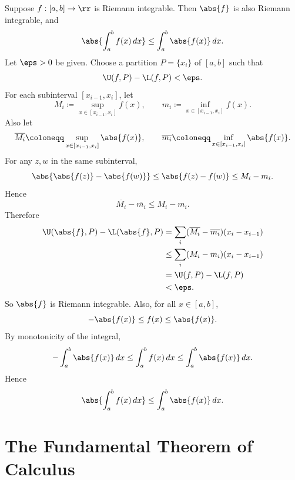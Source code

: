 

\begin{theorem}{
    Suppose $f:[a,b]\to\rr$ is Riemann integrable.
    Then $\abs{f}$ is also Riemann integrable, and
    \[
        \abs{\int_a^b f(x)\,dx}\leq\int_a^b\abs{f(x)}\,dx.
    \]
}
    Let $\eps > 0$ be given.
    Choose a partition $P=\{x_i\}$ of $[a,b]$ such that
    \[
        \U(f,P) - \L(f,P) < \eps.
    \]
    For each subinterval $[x_{i-1},x_i]$, let
    \[
        M_i \coloneqq \sup_{x\in[x_{i-1},x_i]} f(x),
        \qquad
        m_i \coloneqq \inf_{x\in[x_{i-1},x_i]} f(x).
    \]
    Also let
    \[
        \overline{M_i} \coloneqq \sup_{x\in[x_{i-1},x_i]} \abs{f(x)},
        \qquad
        \overline{m_i} \coloneqq \inf_{x\in[x_{i-1},x_i]} \abs{f(x)}.
    \]
    For any $z,w$ in the same subinterval,
    \[
        \abs{\abs{f(z)}-\abs{f(w)}} \leq \abs{f(z)-f(w)} \leq M_i-m_i.
    \]
    Hence
    \[
        \overline{M_i}-\overline{m_i}\leq M_i-m_i.
    \]
    Therefore
    \begin{align*}
        \U(\abs{f},P)-\L(\abs{f},P)
        &= \sum_i (\overline{M_i}-\overline{m_i})(x_i-x_{i-1})\\
        &\leq \sum_i (M_i-m_i)(x_i-x_{i-1})\\
        &= \U(f,P)-\L(f,P)\\
        &< \eps.
    \end{align*}
    So $\abs{f}$ is Riemann integrable.
    Also, for all $x\in[a,b]$,
    \[
        -\abs{f(x)} \leq f(x) \leq \abs{f(x)}.
    \]
    By monotonicity of the integral,
    \[
        -\int_a^b \abs{f(x)}\,dx \leq \int_a^b f(x)\,dx \leq \int_a^b \abs{f(x)}\,dx.
    \]
    Hence
    \[
        \abs{\int_a^b f(x)\,dx}\leq\int_a^b\abs{f(x)}\,dx.
    \]
\end{theorem}

\section{The Fundamental Theorem of Calculus}

